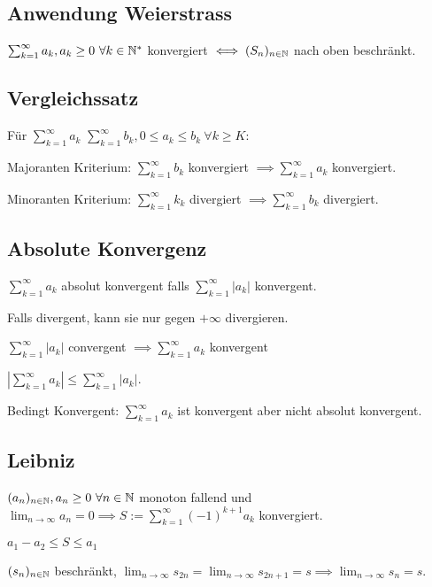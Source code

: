 \subsection{Anwendung Weierstrass}
$\sum_{k=1}^{\infty} a_k, a_k \ge 0 \ \forall k \in \N^*$ konvergiert $\iff (S_n)_{n \in \mathbb{N}}$ nach oben beschränkt.

\subsection{Vergleichssatz}
Für $\sum_{k=1}^{\infty} a_k$ $\sum_{k=1}^{\infty} b_k, 0 \le a_k \le b_k \ \forall k \ge K$:
\begin{compactdesc}
    \item[Majoranten Kriterium:] $\sum_{k=1}^{\infty} b_k$ konvergiert $\implies \sum_{k=1}^{\infty} a_k$ konvergiert.
    \item[Minoranten Kriterium:] $\sum_{k=1}^{\infty} k_k$ divergiert $\implies \sum_{k=1}^{\infty} b_k$ divergiert.
\end{compactdesc}

\subsection{Absolute Konvergenz}
$\sum_{k=1}^{\infty} a_k$ absolut konvergent falls $\sum_{k=1}^{\infty} |a_k|$ konvergent. 
\begin{compactitem}
    \item Falls divergent, kann sie nur gegen $+\infty$ divergieren.
    \item $\sum_{k=1}^{\infty}| a_k|$ convergent $\implies \sum_{k=1}^{\infty} a_k$ konvergent
        \begin{compactitem}
            \item $\left| \sum_{k=1}^{\infty} a_k \right| \le \sum_{k=1}^{\infty} \left| a_k \right|$.
        \end{compactitem}
\end{compactitem}
\begin{compactdesc}
    \item[Bedingt Konvergent:] $\sum_{k=1}^{\infty} a_k$ ist konvergent aber nicht absolut konvergent.
\end{compactdesc}

\subsection{Leibniz}
$(a_n)_{n \in \mathbb{N}}, a_n \ge 0 \ \forall n \in \mathbb{N}$ monoton fallend und $\lim_{n \to \infty} a_n = 0 \implies S:= \sum_{k=1}^{\infty} \left( -1 \right)^{k+1} a_k$ konvergiert.
\begin{compactitem}
    \item $a_1 - a_2 \le S \le a_1$
    \item $(s_n)_{n \in \mathbb{N}}$ beschränkt, $\lim_{n \to \infty} s_{2n} = \lim_{n \to \infty} s_{2n + 1} = s \implies \lim_{n \to \infty} s_n = s$.
\end{compactitem}

